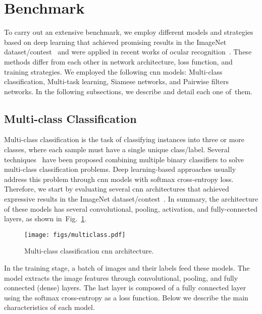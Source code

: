 \documentclass[journal]{IEEEtran}
\begin{document}
\section{Benchmark}
\label{sec:benchmark}

To carry out an extensive benchmark, we employ different models and strategies based on deep learning that achieved promising results in the ImageNet dataset/contest~\cite{deng2009imagenet} and were applied in recent works of ocular recognition~\cite{zanlorensi2018impact, silva2018multimodal, Luz2018, wang2019cross, zanlorensi2020deep}.
These methods differ from each other in network architecture, loss function, and training strategies.
We employed the following \gls{cnn} models: Multi-class classification, Multi-task learning, Siamese networks, and Pairwise filters networks.
In the following subsections, we describe and detail each one of~them.


\subsection{Multi-class Classification}
\label{sec:multiclass}

Multi-class classification is the task of classifying instances into three or more classes, where each sample must have a single unique class/label.
Several techniques~\cite{platt1999dags, hastie2000adaboost, huang2012extreme} have been proposed combining multiple binary classifiers to solve multi-class classification problems.
Deep learning-based approaches usually address this problem through \gls{cnn} models with softmax cross-entropy loss.
Therefore, we start by evaluating several \gls{cnn} architectures that achieved expressive results in the ImageNet dataset/contest~\cite{deng2009imagenet}.
In summary, the architecture of these models has several convolutional, pooling, activation, and fully-connected layers, as shown in~Fig.~\ref{fig:multiclass}.

\begin{figure}[!ht]
\centering

   	\texttt{[image: figs/multiclass.pdf]}

\vspace{-0.5mm}

\caption{Multi-class classification \gls{cnn} architecture.}
\label{fig:multiclass}
\end{figure}

In the training stage, a batch of images and their labels feed these models.
The model extracts the image features through convolutional, pooling, and fully connected (dense) layers.
The last layer is composed of a fully connected layer using the softmax cross-entropy as a loss function.
Below we describe the main characteristics of each model.
\end{document}
